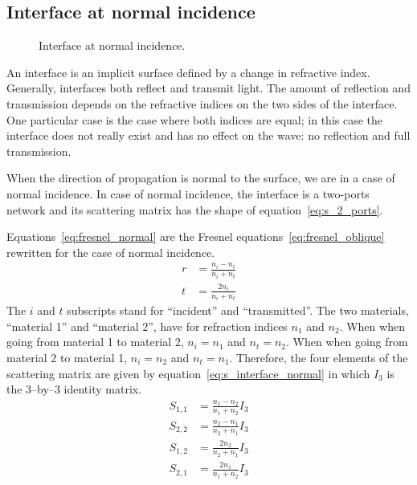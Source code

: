 
\subsection{Interface at normal incidence}
\label{sec:interface_at_normal_incidence}

\begin{figure}[hbtp]
    \centering
    \caption{\label{fig:net_interface_normal}Interface at normal incidence.}
\end{figure}
An interface is an implicit surface defined by a change in refractive index.
Generally, interfaces both reflect and transmit light.
The amount of reflection and transmission depends on the refractive indices on the two sides of the interface.
One particular case is the case where both indices are equal; in this case the interface does not really exist and has no effect on the wave: no reflection and full transmission.

When the direction of propagation is normal to the surface, we are in a case of normal incidence.
In case of normal incidence, the interface is a two-ports network and its scattering matrix has the shape of equation~\eqref{eq:s_2_ports}.

Equations~\eqref{eq:fresnel_normal} are the Fresnel equations~\eqref{eq:fresnel_oblique} rewritten for the case of normal incidence.
\begin{subequations}
    \begin{align}
        r &= \frac{n_i - n_t}{n_i + n_t} \label{eq:fresnel_r}\\
        t &= \frac{2 n_i}{n_i + n_t} \label{eq:fresnel_t}
    \end{align}
    \label{eq:fresnel_normal}
\end{subequations}
The $i$ and $t$ subscripts stand for ``incident'' and ``transmitted''.
The two materials, ``material 1'' and ``material 2'', have for refraction indices $n_1$ and $n_2$.
When when going from material 1 to material 2, $n_i = n_1$ and $n_t = n_2$.
When when going from material 2 to material 1, $n_i = n_2$ and $n_t = n_1$.
Therefore, the four elements of the scattering matrix are given by equation~\eqref{eq:s_interface_normal} in which $I_3$ is the 3--by--3 identity matrix.
\begin{subequations}
    \begin{align}
        S_{1, 1} &= \frac{n_1 - n_2}{n_1 + n_2} I_3
        \\
        S_{2, 2} &= \frac{n_2 - n_1}{n_2 + n_1} I_3
        \\
        S_{1, 2} &= \frac{2 n_2}{n_2 + n_1} I_3
        \\
        S_{2, 1} &= \frac{2 n_1}{n_1 + n_2} I_3
    \end{align}
    \label{eq:s_interface_normal}
\end{subequations}

